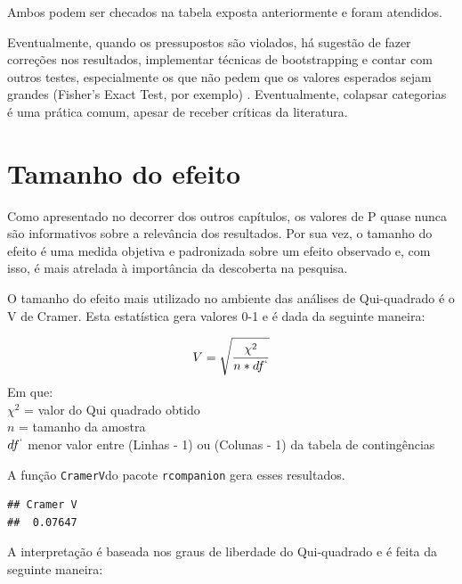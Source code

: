 \documentclass[
]{book}
\newenvironment{Shaded}{\begin{snugshade}}{\end{snugshade}}
\newcommand{\FunctionTok}[1]{\textcolor[rgb]{0.00,0.00,0.00}{#1}}
\newcommand{\NormalTok}[1]{#1}
\newcommand{\SpecialCharTok}[1]{\textcolor[rgb]{0.00,0.00,0.00}{#1}}
\begin{document}
Ambos podem ser checados na tabela exposta anteriormente e foram atendidos.

Eventualmente, quando os pressupostos são violados, há sugestão de fazer correções nos resultados, implementar técnicas de bootstrapping e contar com outros testes, especialmente os que não pedem que os valores esperados sejam grandes (Fisher's Exact Test, por exemplo) \citep{Campbell2007}. Eventualmente, colapsar categorias é uma prática comum, apesar de receber críticas da literatura.

\hypertarget{tamanho-do-efeito}{%
\section{Tamanho do efeito}\label{tamanho-do-efeito}}

Como apresentado no decorrer dos outros capítulos, os valores de P quase nunca são informativos sobre a relevância dos resultados. Por sua vez, o tamanho do efeito é uma medida objetiva e padronizada sobre um efeito observado e, com isso, é mais atrelada à importância da descoberta na pesquisa.

O tamanho do efeito mais utilizado no ambiente das análises de Qui-quadrado é o V de Cramer. Esta estatística gera valores 0-1 e é dada da seguinte maneira:

\[V=\sqrt\frac{\chi^2}{n*df^`}\]
Em que:\\
\(\chi^2\) = valor do Qui quadrado obtido\\
\(n\) = tamanho da amostra\\
\(df^`\) menor valor entre (Linhas - 1) ou (Colunas - 1) da tabela de contingências

A função \texttt{CramerV}do pacote \texttt{rcompanion} gera esses resultados.

\begin{Shaded}
\end{Shaded}

\begin{verbatim}
## Cramer V 
##  0.07647
\end{verbatim}

A interpretação é baseada nos graus de liberdade do Qui-quadrado e é feita da seguinte maneira:
\end{document}
